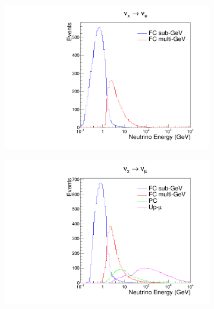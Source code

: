 \begin{figure}[h]
  \begin{subfigure}[t]{0.49\textwidth}
    \includegraphics[width=\textwidth, trim={0mm 0mm 0mm 0mm}, clip,page=1]{Figures/Simulations/NeutrinoEnergyDist_NuE.pdf}
  \end{subfigure}%
  \begin{subfigure}[t]{0.49\textwidth}
    \includegraphics[width=\textwidth, trim={0mm 0mm 0mm 0mm}, clip,page=1]{Figures/Simulations/NeutrinoEnergyDist_NuMu.pdf}
  \end{subfigure}
  \begin{subfigure}[t]{0.49\textwidth}

\end{subfigure}
\end{figure}
